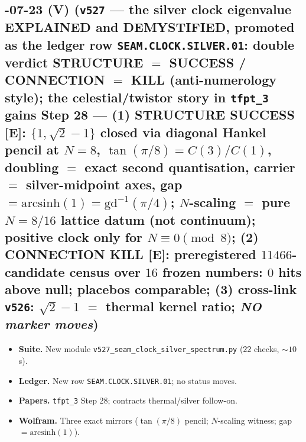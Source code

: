 \documentclass[11pt]{article}
\providecommand{\mE}{\textbf{[E]}}\providecommand{\mC}{\textbf{[C]}}
\providecommand{\vref}[1]{\texttt{#1}}
\begin{document}
\subsection*{-07-23 (V) (\texttt{v527} --- the silver clock eigenvalue EXPLAINED and DEMYSTIFIED, promoted as the ledger row \texttt{SEAM.CLOCK.SILVER.01}: double verdict STRUCTURE $=$ SUCCESS / CONNECTION $=$ KILL (anti-numerology style); the celestial/twistor story in \texttt{tfpt\_3} gains Step 28 --- (1) STRUCTURE SUCCESS \mE: $\{1,\sqrt2-1\}$ closed via diagonal Hankel pencil at $N=8$, $\tan(\pi/8)=C(3)/C(1)$, doubling $=$ exact second quantisation, carrier $=$ silver-midpoint axes, gap $=\mathrm{arcsinh}(1)=\mathrm{gd}^{-1}(\pi/4)$; $N$-scaling $=$ pure $N=8/16$ lattice datum (not continuum); positive clock only for $N\equiv0\pmod8$; (2) CONNECTION KILL \mE: preregistered $11466$-candidate census over $16$ frozen numbers: $0$ hits above null; placebos comparable; (3) cross-link \vref{v526}: $\sqrt2-1$ $=$ thermal kernel ratio; \emph{NO marker moves})}
\begin{itemize}[leftmargin=1.5em]
\item \textbf{Suite.} New module \texttt{v527\_seam\_clock\_silver\_spectrum.py} ($22$ checks, $\sim10$ s).
\item \textbf{Ledger.} New row \texttt{SEAM.CLOCK.SILVER.01}; no status moves.
\item \textbf{Papers.} \texttt{tfpt\_3} Step 28; contracts thermal/silver follow-on.
\item \textbf{Wolfram.} Three exact mirrors ($\tan(\pi/8)$ pencil; $N$-scaling witness; gap $=\mathrm{arcsinh}(1)$).
\end{itemize}
\end{document}
